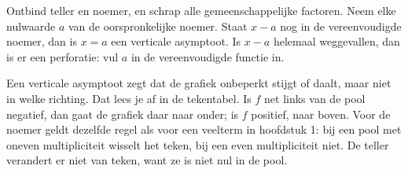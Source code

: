 
\begin{werkwijze}
Ontbind teller en noemer, en schrap alle gemeenschappelijke factoren. Neem elke nulwaarde $a$ van de oorspronkelijke noemer. Staat $x - a$ nog in de vereenvoudigde noemer, dan is $x = a$ een verticale asymptoot. Is $x - a$ helemaal weggevallen, dan is er een perforatie: vul $a$ in de vereenvoudigde functie in.
\end{werkwijze}

\begin{oefeningen}
\end{oefeningen}

Een verticale asymptoot zegt dat de grafiek onbeperkt stijgt of daalt, maar niet in welke richting. Dat lees je af in de tekentabel. Is $f$ net links van de pool negatief, dan gaat de grafiek daar naar onder; is $f$ positief, naar boven. Voor de noemer geldt dezelfde regel als voor een veelterm in hoofdstuk 1: bij een pool met oneven multipliciteit wisselt het teken, bij een even multipliciteit niet. De teller verandert er niet van teken, want ze is niet nul in de pool.

